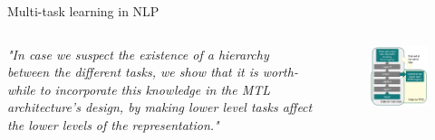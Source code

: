 \documentclass[12pt]{beamer}
\begin{document}
\begin{frame}{Multi-task learning in NLP}
	
	\begin{columns}
		\begin{column}{0.5\linewidth}
			
			\begin{small}
			\emph{"In case we suspect the existence of a hierarchy between the different tasks, we show that it is worth-while to incorporate this knowledge in the MTL architecture’s design, by making lower level tasks affect the lower levels of the representation." }
			\end{small}			
		\end{column}
	\begin{column}{0.5\linewidth}
		
		\begin{figure}
			\includegraphics[width=\linewidth]{img/multitask-nlp.png}
		\end{figure}
	\end{column}
	\end{columns}

\bigskip

\begin{footnotesize}
\end{footnotesize}

\end{frame}
\end{document}
